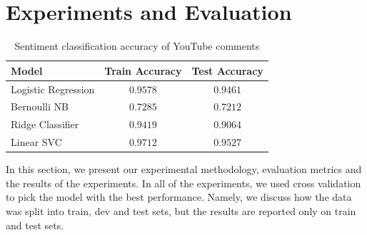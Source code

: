\section{Experiments and Evaluation}
\label{sec:exp}
\begin{table}%
\centering
\begin{tabular}{|l|c|c|}
\hline
Model & Train Accuracy & Test Accuracy \\
\hline
Logistic Regression & $0.9578$ & $0.9461$ \\
\hline
Bernoulli NB & $0.7285$ & $0.7212$ \\
\hline
Ridge Classifier & $0.9419$ & $0.9064$ \\
\hline
Linear SVC & $0.9712$ & $0.9527$ \\
\hline
\end{tabular}
\caption{Sentiment classification accuracy of YouTube comments}
\label{tab:accuracy}
\end{table}

In this section, we present our experimental methodology, evaluation metrics and the results of the experiments. In all of the experiments, we used cross validation to pick the model with the best performance. Namely, we discuss how the data was split into train, dev and test sets, but the results are reported only on train and test sets.

